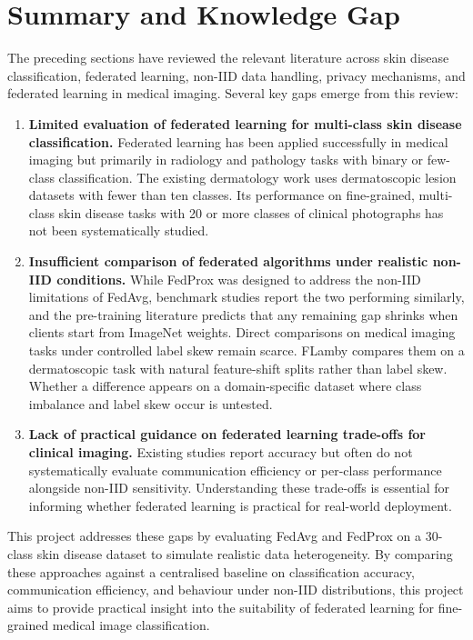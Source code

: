 \documentclass[12pt,openany,a4paper]{book}
\begin{document}
\section{Summary and Knowledge Gap}
The preceding sections have reviewed the relevant literature across skin disease classification, federated learning, non-IID data handling, privacy mechanisms, and federated learning in medical imaging. Several key gaps emerge from this review:

\begin{enumerate}
  \item \textbf{Limited evaluation of federated learning for multi-class skin disease classification.} Federated learning has been applied successfully in medical imaging but primarily in radiology and pathology tasks with binary or few-class classification. The existing dermatology work uses dermatoscopic lesion datasets with fewer than ten classes. Its performance on fine-grained, multi-class skin disease tasks with 20 or more classes of clinical photographs has not been systematically studied.
  \item \textbf{Insufficient comparison of federated algorithms under realistic non-IID conditions.} While FedProx was designed to address the non-IID limitations of FedAvg, benchmark studies report the two performing similarly, and the pre-training literature predicts that any remaining gap shrinks when clients start from ImageNet weights. Direct comparisons on medical imaging tasks under controlled label skew remain scarce. FLamby compares them on a dermatoscopic task with natural feature-shift splits rather than label skew. Whether a difference appears on a domain-specific dataset where class imbalance and label skew occur is untested.
  \item \textbf{Lack of practical guidance on federated learning trade-offs for clinical imaging.} Existing studies report accuracy but often do not systematically evaluate communication efficiency or per-class performance alongside non-IID sensitivity. Understanding these trade-offs is essential for informing whether federated learning is practical for real-world deployment.
\end{enumerate}

This project addresses these gaps by evaluating FedAvg and FedProx on a 30-class skin disease dataset to simulate realistic data heterogeneity. By comparing these approaches against a centralised baseline on classification accuracy, communication efficiency, and behaviour under non-IID distributions, this project aims to provide practical insight into the suitability of federated learning for fine-grained medical image classification.
\end{document}
